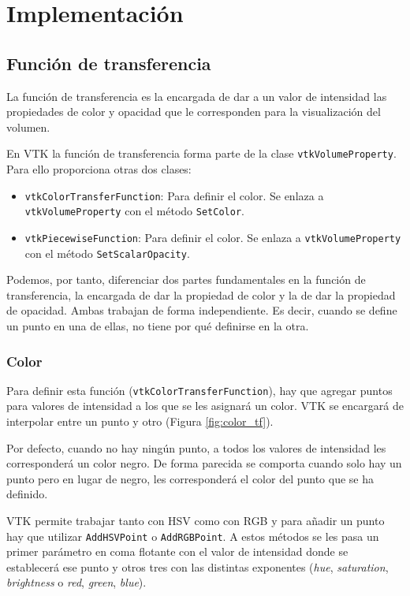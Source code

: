 \chapter{Implementación}

\section{Función de transferencia}

La función de transferencia es la encargada de dar a un valor de intensidad las propiedades de color y opacidad que le corresponden para la visualización del volumen.

En VTK la función de transferencia forma parte de la clase \texttt{vtkVolumeProperty}. Para ello proporciona otras dos clases:
\begin{itemize}
	\item \texttt{vtkColorTransferFunction}: Para definir el color. Se enlaza a \texttt{vtkVolumeProperty} con el método \texttt{SetColor}.
	\item \texttt{vtkPiecewiseFunction}: Para definir el color. Se enlaza a \texttt{vtkVolumeProperty} con el método \texttt{SetScalarOpacity}.
\end{itemize}

Podemos, por tanto, diferenciar dos partes fundamentales en la función de transferencia, la encargada de dar la propiedad de color y la de dar la propiedad de opacidad. Ambas trabajan de forma independiente. Es decir, cuando se define un punto en una de ellas, no tiene por qué definirse en la otra.

\subsection{Color}

Para definir esta función (\texttt{vtkColorTransferFunction}), hay que agregar puntos para valores de intensidad a los que se les asignará un color. VTK se encargará de interpolar entre un punto y otro (Figura \ref{fig:color_tf}). 

Por defecto, cuando no hay ningún punto, a todos los valores de intensidad les corresponderá un color negro. De forma parecida se comporta cuando solo hay un punto pero en lugar de negro, les corresponderá el color del punto que se ha definido.

VTK permite trabajar tanto con HSV como con RGB y para añadir un punto hay que utilizar \texttt{AddHSVPoint} o \texttt{AddRGBPoint}. A estos métodos se les pasa un primer parámetro en coma flotante con el valor de intensidad donde se establecerá ese punto y otros tres con las distintas exponentes (\textit{hue}, \textit{saturation}, \textit{brightness} o \textit{red}, \textit{green}, \textit{blue}).

